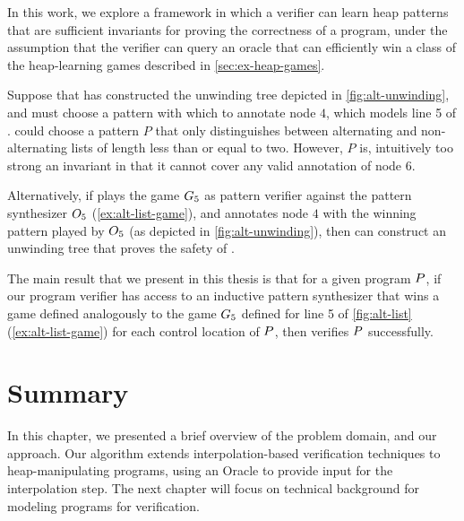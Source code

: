 In this work, we explore a framework in which a verifier can learn heap patterns that are sufficient invariants for proving the correctness of a program, under the assumption that the verifier can query an oracle that can efficiently win a class of the heap-learning games described in \autoref{sec:ex-heap-games}.
%
\begin{ex}
  \label{ex:alt-list-pat-syn}
  Suppose that \verifier has constructed the unwinding tree depicted
  in \autoref{fig:alt-unwinding}, and must choose a pattern with which
  to annotate node $4$, which models line 5 of \altlist.
  \verifier could choose a pattern $P$ that only distinguishes between
  alternating and non-alternating lists of length less than or equal
  to two.
  However, $P$ is, intuitively too strong an invariant in that it
  cannot cover any valid annotation of node $6$.

  Alternatively, if \verifier plays the game $G_5$ as pattern
  verifier against the pattern synthesizer $O_5$
  (\autoref{ex:alt-list-game}), and annotates node $4$ with the
  winning pattern played by $O_5$ (as depicted in
  \autoref{fig:alt-unwinding}), then \verifier can construct an
  unwinding tree that proves the safety of \altlist.
\end{ex}

The main result that we present in this thesis is that for a given
program $P$, if our program verifier \verifier has access to an
inductive pattern synthesizer that wins a game defined analogously to
the game $G_5$ defined for line 5 of \autoref{fig:alt-list}
(\autoref{ex:alt-list-game}) for each control location of $P$,
then \verifier verifies $P$ successfully.

\section*{Summary}
In this chapter, we presented a brief overview of the problem domain, and our approach. Our algorithm extends interpolation-based verification techniques to heap-manipulating programs, using an Oracle to provide input for the interpolation step. The next chapter will focus on technical background for modeling programs for verification.